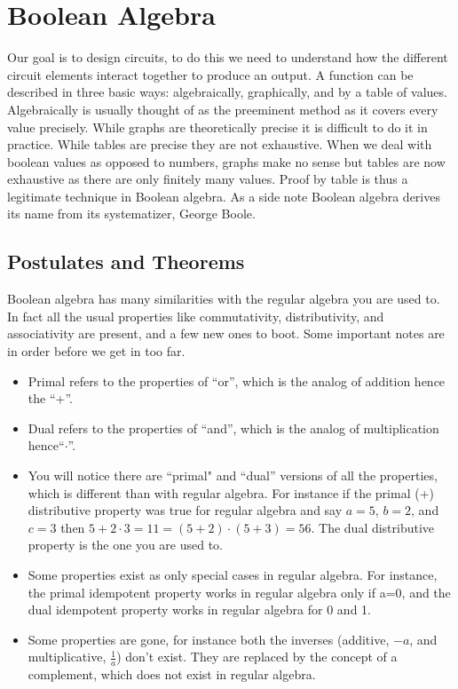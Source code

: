 \chapter{Boolean Algebra}
\label{c-bool}

Our goal is to design circuits, to do this we need to understand how the different circuit elements interact together to produce an output.  A function can be described in three basic ways: algebraically, graphically, and by a table of values.  Algebraically is usually thought of as the preeminent method as it covers every value precisely.  While graphs are theoretically precise it is difficult to do it in practice.  While tables are precise they are not exhaustive.  When we deal with boolean values as opposed to numbers, graphs make no sense but tables are now exhaustive as there are only finitely many values.  Proof by table is thus a legitimate technique in Boolean algebra.  As a side note Boolean algebra derives its name from its systematizer, George Boole.

\section{Postulates and Theorems}

Boolean algebra has many similarities with the regular algebra you are used to.  In fact all the usual properties like commutativity, distributivity, and associativity are present, and a few new ones to boot.  Some important notes are in order before we get in too far.
\begin{itemize}
    \item Primal refers to the properties of ``or'', which is the analog of addition hence the ``+''.
    \item Dual refers to the properties of ``and'', which is the analog of multiplication hence``$\cdot$''.
    \item You will notice there are ``primal" and ``dual'' versions of all the properties, which is different than with regular algebra.  For instance if the primal (+) distributive property was true for regular algebra and say $a=5$, $b=2$, and $c=3$ then $5+2\cdot 3 = 11 = (5+2)\cdot(5+3) = 56$. The dual distributive property is the one you are used to.
    \item Some properties exist as only special cases in regular algebra.  For instance, the primal idempotent property works in regular algebra only if a=0, and the dual idempotent property works in regular algebra for 0 and 1.
    \item Some properties are gone, for instance both the inverses (additive, $-a$, and multiplicative, $\frac{1}{a}$) don't exist.  They are replaced by the concept of a complement, which does not exist in regular algebra.
\end{itemize}

